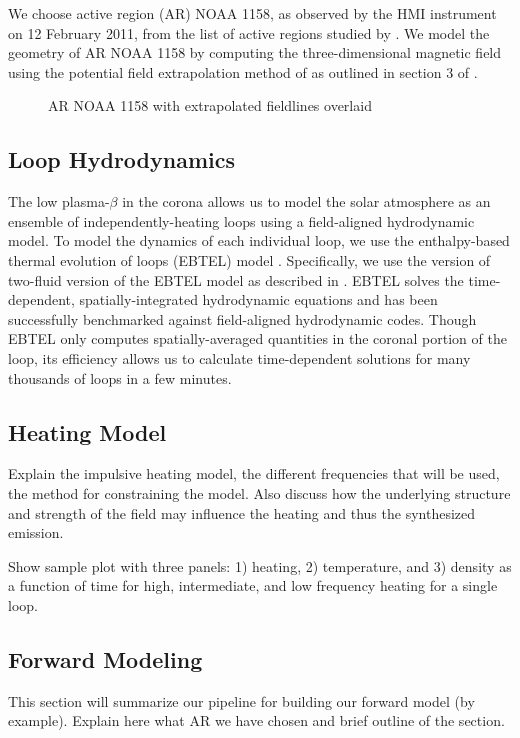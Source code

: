 \documentclass[preprint,linenumbers]{aastex62}
\begin{document}
We choose active region (AR) NOAA 1158, as observed by the HMI instrument \citet{hoeksema_helioseismic_2014} on 12 February 2011, from the list of active regions studied by \citet{warren_systematic_2012}. We model the geometry of AR NOAA 1158 by computing the three-dimensional magnetic field using the potential field extrapolation method of \citet{schmidt_observable_1964} as outlined in section 3 of \citet{sakurai_greens_1982}. 

\begin{figure}
    \caption{AR NOAA 1158 with extrapolated fieldlines overlaid}
    \label{fig:magnetogram}
\end{figure}

\subsection{Loop Hydrodynamics}
\label{loops}
The low plasma-$\beta$ in the corona allows us to model the solar atmosphere as an ensemble of independently-heating loops using a field-aligned hydrodynamic model. To model the dynamics of each individual loop, we use the enthalpy-based thermal evolution of loops (EBTEL) model \citep{klimchuk_highly_2008,cargill_enthalpy-based_2012}. Specifically, we use the version of two-fluid version of the EBTEL model as described in \citep{barnes_inference_2016}. EBTEL solves the time-dependent, spatially-integrated hydrodynamic equations and has been successfully benchmarked against field-aligned hydrodynamic codes. Though EBTEL only computes spatially-averaged quantities in the coronal portion of the loop, its efficiency allows us to calculate time-dependent solutions for many thousands of loops in a few minutes.


\subsection{Heating Model}
\label{heating}
Explain the impulsive heating model, the different frequencies that will be used, the method for constraining the model. Also discuss how the underlying structure and strength of the field may influence the heating and thus the synthesized emission.

Show sample plot with three panels: 1) heating, 2) temperature, and 3) density as a function of time for high, intermediate, and low frequency heating for a single loop.

\subsection{Forward Modeling}
\label{forward}
This section will summarize our pipeline for building our forward model (by example). Explain here what AR we have chosen and brief outline of the section.
\end{document}
